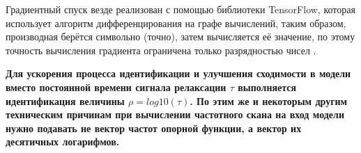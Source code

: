 	Градиентный спуск везде реализован с помощью библиотеки TensorFlow,
	которая использует алгоритм дифференцирования на графе вычислений,
	таким образом, производная берётся символьно (точно), затем вычисляется
	её значение, по этому точность вычисления градиента ограничена только
	разрядностью чисел \cite{hands_on_ml}.

	\textbf{Для ускорения процесса идентификации и улучшения сходимости
	в модели вместо постоянной времени сигнала релаксации $\tau$ 
	выполняется идентификация величины $\rho = log10(\tau)$. По этим же
	и некоторым	другим техническим причинам при вычислении частотного 
	скана на вход модели нужно подавать не вектор частот опорной 
	функции, а вектор их десятичных логарифмов.}